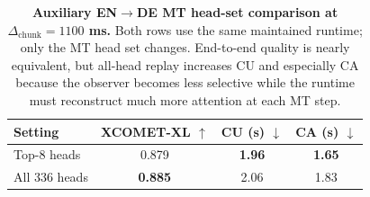 \begin{table}[t]
\centering
\small
\setlength{\tabcolsep}{4pt}
\begin{tabular}{l c c c}
\toprule
Setting & XCOMET-XL $\uparrow$ & CU (s) $\downarrow$ & CA (s) $\downarrow$ \\
\midrule
Top-8 heads & 0.879 & \textbf{1.96} & \textbf{1.65} \\
All 336 heads & \textbf{0.885} & 2.06 & 1.83 \\
\bottomrule
\end{tabular}
\caption{\textbf{Auxiliary EN$\to$DE MT head-set comparison at $\Delta_{\mathrm{chunk}}=1100$ ms.} Both rows use the same maintained runtime; only the MT head set changes. End-to-end quality is nearly equivalent, but all-head replay increases CU and especially CA because the observer becomes less selective while the runtime must reconstruct much more attention at each MT step.}
\label{tab:mt-e2e-head-filtering}
\end{table}
